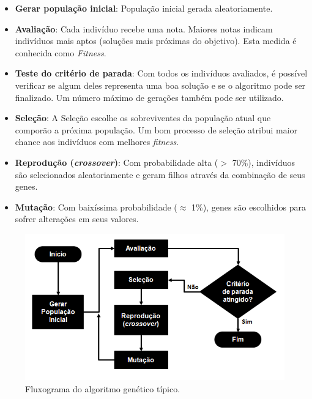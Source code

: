 \begin{itemize}

	\item \textbf{Gerar população inicial}: População inicial gerada aleatoriamente.
	
	\item \textbf{Avaliação}: Cada indivíduo recebe uma nota. Maiores notas indicam indivíduos mais aptos (soluções mais próximas do objetivo). Esta medida é conhecida como \textit{Fitness}. 
	
	\item \textbf{Teste do critério de parada}: Com todos os indivíduos avaliados, é possível verificar se algum deles representa uma boa solução e se o algoritmo pode ser finalizado. Um número máximo de gerações também pode ser utilizado.
 
	\item \textbf{Seleção}: A Seleção escolhe os sobreviventes da população atual que comporão a próxima população. Um bom processo de seleção atribui maior chance aos indivíduos com melhores \emph{fitness}.
 
	\item \textbf{Reprodução (\emph{crossover})}: Com probabilidade alta ($>$ 70\%), indivíduos são selecionados aleatoriamente e geram filhos através da combinação de seus genes.
	
	\item \textbf{Mutação}: Com baixíssima probabilidade ($\approx$ 1\%), genes são escolhidos para sofrer alterações em seus valores.
	
\end{itemize} 

\begin{figure}[htbp]
	\centering
		\includegraphics[width=1.00\textwidth]{figs/ga/fluxoGABasico.png}
	\caption{Fluxograma do algoritmo genético típico.}
	\label{fig:fluxoGABasico}
\end{figure}

